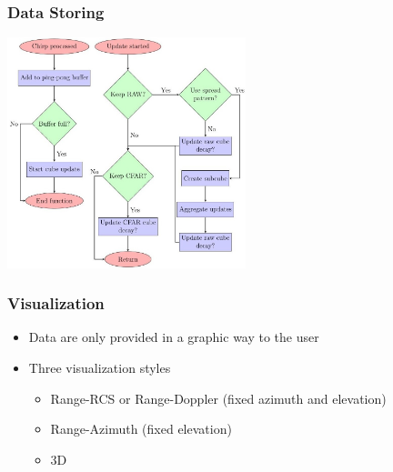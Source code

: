 \documentclass[aspectratio=169]{beamer}
\begin{document}
\begin{frame}[fragile]
  \frametitle{Data Storing}
  \begin{center}
    \includegraphics[width=0.52\textwidth]{../img/dataflow_3.jpg}
  \end{center}
\end{frame}

\begin{frame}[fragile]
  \frametitle{Visualization}
  \begin{itemize}
    \item Data are only provided in a graphic way to the user
    \item Three visualization styles
      \begin{itemize}
				\item Range-RCS or Range-Doppler (fixed azimuth and elevation)
				\item Range-Azimuth (fixed elevation)
        \item 3D
      \end{itemize}
  \end{itemize}
\end{frame}
\end{document}
